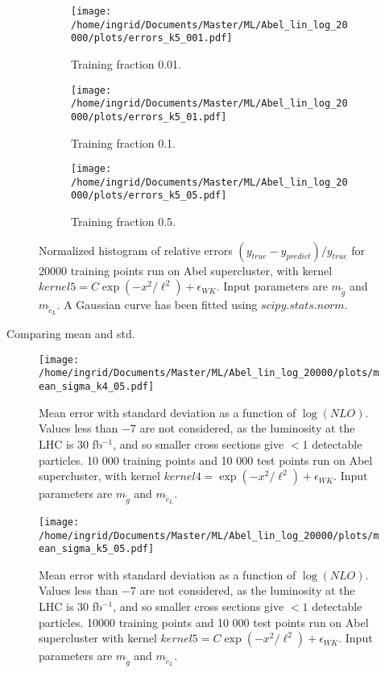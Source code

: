 \documentclass[twoside,english]{uiofysmaster}
\begin{document}
\begin{figure}
\centering
	\begin{subfigure}[b]{0.65\textwidth}
	\texttt{[image: /home/ingrid/Documents/Master/ML/Abel\_lin\_log\_20000/plots/errors\_k5\_001.pdf]}
	\caption{Training fraction 0.01.}
	\end{subfigure}
	\begin{subfigure}[b]{0.65\textwidth}
	\texttt{[image: /home/ingrid/Documents/Master/ML/Abel\_lin\_log\_20000/plots/errors\_k5\_01.pdf]}
	\caption{Training fraction 0.1.}
	\end{subfigure}
	\begin{subfigure}[b]{0.65\textwidth}
	\texttt{[image: /home/ingrid/Documents/Master/ML/Abel\_lin\_log\_20000/plots/errors\_k5\_05.pdf]}
	\caption{Training fraction 0.5.}
	\end{subfigure}
\caption{Normalized histogram of relative errors $(y_{true} - y_{predict})/y_{true}$ for 20000 training points run on Abel supercluster, with kernel $kernel5 = C \exp(-x^2/\ell^2)+ \epsilon_{WK}$. Input parameters are $m_{\tilde{g}}$ and $m_{\tilde{c}_L}$. A Gaussian curve has been fitted using $scipy.stats.norm$.}
\label{Fig:: Error histograms k5 abel 20k}
\end{figure}


Comparing mean and std.

\begin{figure}[H]
\centering
\texttt{[image: /home/ingrid/Documents/Master/ML/Abel\_lin\_log\_20000/plots/mean\_sigma\_k4\_05.pdf]}
\caption{Mean error with standard deviation as a function of $\log (NLO)$. Values less than $-7$ are not considered, as the luminosity at the LHC is $30$ fb$^{-1}$, and so smaller cross sections give $<1$ detectable particles. 10 000 training points and 10 000 test points run on Abel supercluster, with kernel $kernel4 = \exp(-x^2/\ell^2) + \epsilon_{WK}$. Input parameters are $m_{\tilde{g}}$ and $m_{\tilde{c}_L}$.}
\end{figure}

\begin{figure}[H]
\centering
\texttt{[image: /home/ingrid/Documents/Master/ML/Abel\_lin\_log\_20000/plots/mean\_sigma\_k5\_05.pdf]}
\caption{Mean error with standard deviation as a function of $\log (NLO)$. Values less than $-7$ are not considered, as the luminosity at the LHC is $30$ fb$^{-1}$, and so smaller cross sections give $<1$ detectable particles. 10000 training points and 10 000 test points run on Abel supercluster with kernel $kernel5 = C\exp(-x^2/\ell^2) + \epsilon_{WK}$. Input parameters are $m_{\tilde{g}}$ and $m_{\tilde{c}_L}$.}
\end{figure}
\end{document}

